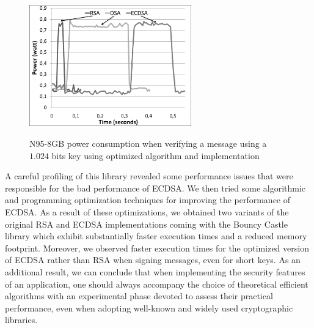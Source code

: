 \documentclass[authoryear]{elsarticle}
\begin{document}
\begin{figure}[t]
\begin{center}
  \includegraphics[width=7cm]{immagini/N95PowerVerify_OPT.pdf}\\
  \caption{N95-8GB power consumption when verifying a message using a $1.024$ bits key using optimized algorithm and implementation}
  \label{fig:N95PowerVerify_OPT}
\end{center}
\end{figure}

A careful profiling of this library revealed some performance issues that were responsible for the bad performance of ECDSA. We then tried some algorithmic and programming optimization techniques for improving the performance of ECDSA. As a result of these optimizations, we obtained two variants of the original RSA and ECDSA implementations coming with the Bouncy Castle library which exhibit substantially faster execution times and a reduced memory footprint. 
Moreover, we observed faster execution times for the optimized version of ECDSA rather than RSA when signing messages, even for short keys. As an additional result, we can conclude that when implementing the security features of an application, one should always accompany the choice of theoretical efficient algorithms with an experimental phase devoted to assess their practical performance, even when adopting well-known and widely used cryptographic libraries. 
 




\end{document}
